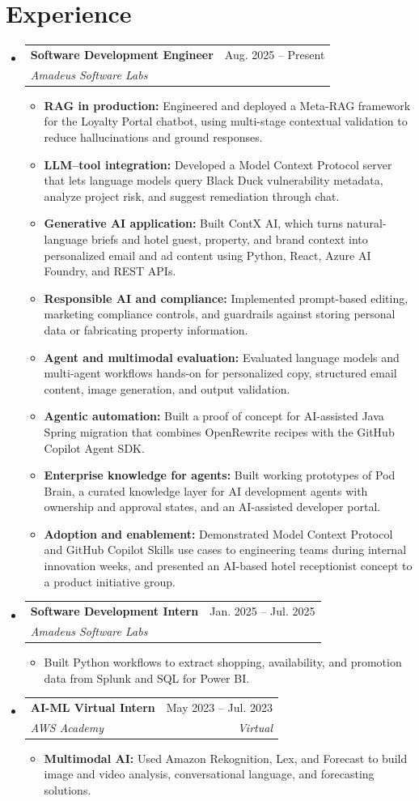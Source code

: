 \documentclass[a4paper,11pt]{article}
\makeatletter
\newcommand{\entry}[4]{\item\begin{tabularx}{\textwidth}{@{}Xr@{}}\textbf{#1}& #2\\\textit{\small #3}&\textit{\small #4}\end{tabularx}\vspace{-5pt}}
\newcommand{\bulletpoint}[1]{\item\small{#1}}
\makeatother
\begin{document}
\section{Experience}
\begin{itemize}[leftmargin=0in,label={}]
  \entry{Software Development Engineer}{Aug. 2025 -- Present}{Amadeus Software Labs}{}
  \begin{itemize}
    \bulletpoint{\textbf{RAG in production:} Engineered and deployed a Meta-RAG framework for the Loyalty Portal chatbot, using multi-stage contextual validation to reduce hallucinations and ground responses.}
    \bulletpoint{\textbf{LLM--tool integration:} Developed a Model Context Protocol server that lets language models query Black Duck vulnerability metadata, analyze project risk, and suggest remediation through chat.}
    \bulletpoint{\textbf{Generative AI application:} Built ContX AI, which turns natural-language briefs and hotel guest, property, and brand context into personalized email and ad content using Python, React, Azure AI Foundry, and REST APIs.}
    \bulletpoint{\textbf{Responsible AI and compliance:} Implemented prompt-based editing, marketing compliance controls, and guardrails against storing personal data or fabricating property information.}
    \bulletpoint{\textbf{Agent and multimodal evaluation:} Evaluated language models and multi-agent \mbox{workf{}lows} hands-on for personalized copy, structured email content, image generation, and output validation.}
    \bulletpoint{\textbf{Agentic automation:} Built a proof of concept for AI-assisted Java Spring migration that combines OpenRewrite recipes with the GitHub Copilot Agent SDK.}
    \bulletpoint{\textbf{Enterprise knowledge for agents:} Built working prototypes of Pod Brain, a curated knowledge layer for AI development agents with ownership and approval states, and an AI-assisted developer portal.}
    \bulletpoint{\textbf{Adoption and enablement:} Demonstrated Model Context Protocol and GitHub Copilot Skills use cases to engineering teams during internal innovation weeks, and presented an AI-based hotel receptionist concept to a product initiative group.}
  \end{itemize}
  \entry{Software Development Intern}{Jan. 2025 -- Jul. 2025}{Amadeus Software Labs}{}
  \begin{itemize}
    \bulletpoint{Built Python workf{}lows to extract shopping, availability, and promotion data from Splunk and SQL for Power BI.}
  \end{itemize}
  \entry{AI-ML Virtual Intern}{May 2023 -- Jul. 2023}{AWS Academy}{Virtual}
  \begin{itemize}
    \bulletpoint{\textbf{Multimodal AI:} Used Amazon Rekognition, Lex, and Forecast to build image and video analysis, conversational language, and forecasting solutions.}
  \end{itemize}
\end{itemize}
\end{document}
